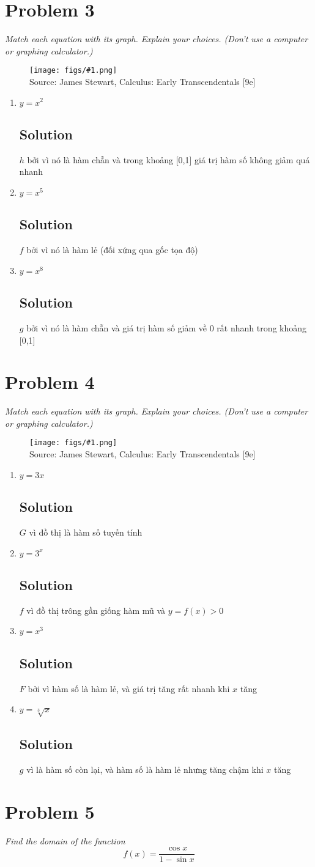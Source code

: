 \documentclass[11pt]{article}
\newcommand{\soln}{\subsection*}
\newcommand{\qn}{\textit}
\newcommand{\imagesource}[1]{{\footnotesize Source: #1}}
\newcommand{\imgqn}[1]{
	\begin{figure}[H]
		\centering
		\texttt{[image: figs/\#1.png]}\\
		\imagesource{James Stewart, Calculus: Early Transcendentals [9e]}
	\end{figure}
}
\begin{document}
\section*{Problem 3}

\qn{Match each equation with its graph. Explain your choices. (Don't use a computer or graphing calculator.)}

\imgqn{1.2.3}

\begin{enumerate}
	\item $y=x^2$
	\soln{Solution}
	$h$ bởi vì nó là hàm chẵn và trong khoảng [0,1] giá trị hàm số không giảm quá nhanh
	
	\item $y=x^5$
	\soln{Solution}
	$f$ bởi vì nó là hàm lẻ (đối xứng qua gốc tọa độ)
	
	\item $y=x^8$
	\soln{Solution}
	$g$ bởi vì nó là hàm chẵn và giá trị hàm số giảm về 0 rất nhanh trong khoảng [0,1]
\end{enumerate}

\section*{Problem 4}

\qn{Match each equation with its graph. Explain your choices. (Don't use a computer or graphing calculator.)}

\imgqn{1.2.4}

\begin{enumerate}
	\item $y=3x$
	\soln{Solution}
	$G$ vì đồ thị là hàm số tuyến tính
	
	\item $y=3^x$
	\soln{Solution}
	$f$ vì đồ thị trông gần giống hàm mũ và $y=f(x) > 0$
	
	\item $y=x^3$
	\soln{Solution}
	$F$ bởi vì hàm số là hàm lẻ, và giá trị tăng rất nhanh khi $x$ tăng
	
	\item $y=\sqrt[3]{x}$
	\soln{Solution}
	$g$ vì là hàm số còn lại, và hàm số là hàm lẻ nhưng tăng chậm khi $x$ tăng
\end{enumerate}

\section*{Problem 5}

\qn{Find the domain of the function $$f(x)=\frac{\cos{x}}{1-\sin{x}}$$}
\end{document}
